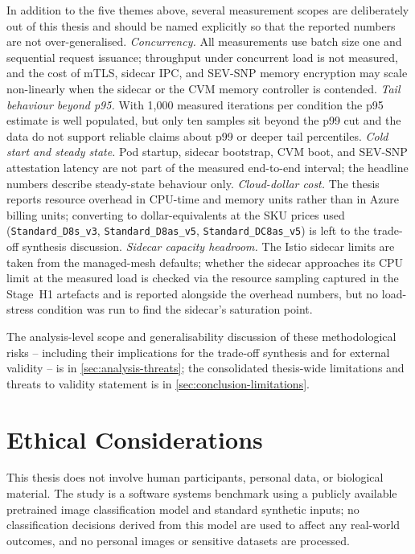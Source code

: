 In addition to the five themes above, several measurement scopes are deliberately out of
this thesis and should be named explicitly so that the reported numbers are not
over-generalised. \emph{Concurrency.} All measurements use batch size one and sequential
request issuance; throughput under concurrent load is not measured, and the cost of
mTLS, sidecar IPC, and SEV-SNP memory encryption may scale non-linearly when the sidecar
or the CVM memory controller is contended. \emph{Tail behaviour beyond p95.} With 1{,}000
measured iterations per condition the p95 estimate is well populated, but only ten
samples sit beyond the p99 cut and the data do not support reliable claims about p99 or
deeper tail percentiles. \emph{Cold start and steady state.} Pod startup, sidecar
bootstrap, CVM boot, and SEV-SNP attestation latency are not part of the measured
end-to-end interval; the headline numbers describe steady-state behaviour only.
\emph{Cloud-dollar cost.} The thesis reports resource overhead in CPU-time and memory
units rather than in Azure billing units; converting to dollar-equivalents at the SKU
prices used (\texttt{Standard\_D8s\_v3}, \texttt{Standard\_D8as\_v5},
\texttt{Standard\_DC8as\_v5}) is left to the trade-off synthesis discussion.
\emph{Sidecar capacity headroom.} The Istio sidecar limits are taken from the managed-mesh
defaults; whether the sidecar approaches its CPU limit at the measured load is checked
via the resource sampling captured in the Stage~H1 artefacts and is reported alongside the
overhead numbers, but no load-stress condition was run to find the sidecar's saturation
point.

The analysis-level scope and generalisability discussion of these methodological
risks -- including their implications for the trade-off synthesis and for
external validity -- is in \cref{sec:analysis-threats}; the consolidated
thesis-wide limitations and threats to validity statement is in
\cref{sec:conclusion-limitations}.

\section{Ethical Considerations}
\label{sec:methods-ethics}

This thesis does not involve human participants, personal data, or biological material.
The study is a software systems benchmark using a publicly available pretrained image
classification model and standard synthetic inputs; no classification decisions derived
from this model are used to affect any real-world outcomes, and no personal images or
sensitive datasets are processed.

